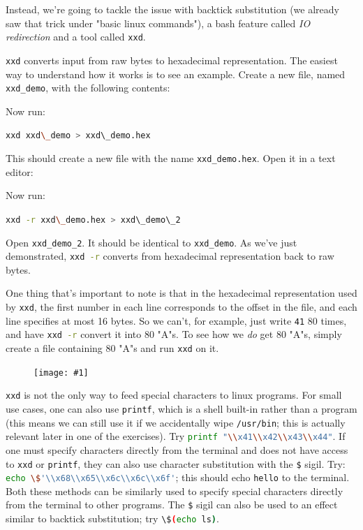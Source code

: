 \documentclass{article}
\newcommand{\wrapimageleft}[1] {
    \begin{figure}
        \begin{center}
            \texttt{[image: \#1]} 
        \end{center}
    \end{figure}
}
\newcommand{\xcode}[2]{\colorbox{ubuntuback}{\lstinline[language=#1]|#2|}}
\newcommand{\code}[1]{\colorbox{ubuntuback}{\texttt{#1}}}
\begin{document}
Instead, we're going to tackle the issue with backtick substitution (we already saw that trick under "basic linux commands"), a bash feature called \textit{IO redirection} and a tool called \code{xxd}.

\code{xxd} converts input from raw bytes to hexadecimal representation. The easiest way to understand how it works is to see an example. Create a new file, named \code{xxd\_demo}, with the following contents:



Now run:

\xcode{bash}{xxd xxd\_demo > xxd\_demo.hex}

This should create a new file with the name \code{xxd\_demo.hex}. Open it in a text editor:



Now run:

\xcode{bash}{xxd -r xxd\_demo.hex > xxd\_demo\_2}

Open \code{xxd\_demo\_2}. It should be identical to \code{xxd\_demo}. As we've just demonstrated, \xcode{bash}{xxd -r} converts from hexadecimal representation back to raw bytes. 

One thing that's important to note is that in the hexadecimal representation used by \code{xxd}, the first number in each line corresponds to the offset in the file, and each line specifies at most 16 bytes. So we can't, for example, just write \code{41} 80 times, and have \xcode{bash}{xxd -r} convert it into 80 "A"s. To see how we \textit{do} get 80 "A"s, simply create a file containing 80 "A"s and run \xcode{bash}{xxd} on it.

\wrapimageleft{./images/ascii_table.png}
\code{xxd} is not the only way to feed special characters to linux programs. For small use cases, one can also use \code{printf}, which is a shell built-in rather than a program (this means we can still use it if we accidentally wipe \code{/usr/bin}; this is actually relevant later in one of the exercises). Try \xcode{bash}{printf "\\x41\\x42\\x43\\x44"}. If one must specify characters directly from the terminal and does not have access to \code{xxd} or \code{printf}, they can also use character substitution with the \code{\$} sigil. Try: \xcode{bash}{echo \$'\\x68\\x65\\x6c\\x6c\\x6f'}; this should echo \xcode{bash}{hello} to the terminal. Both these methods can be similarly used to specify special characters directly from the terminal to other programs. The \code{\$} sigil can also be used to an effect similar to backtick substitution; try \xcode{bash}{\$(echo ls)}.
\end{document}

